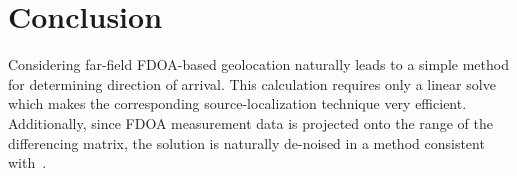 \section{Conclusion}
\label{s:conclusion}
Considering far-field FDOA-based geolocation naturally leads to a simple method for determining direction of arrival. This calculation requires only a linear solve which makes the corresponding source-localization technique very efficient. Additionally, since FDOA measurement data is projected onto the range of the differencing matrix, the solution is naturally de-noised in a method consistent with~\cite{Schmidt1996,Compagnoni2017}.
